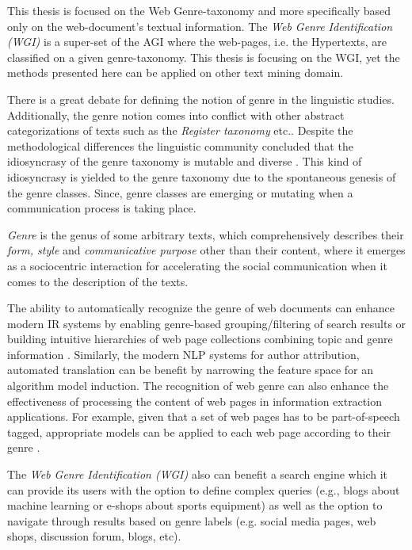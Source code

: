 This thesis is focused on the Web Genre-taxonomy and more specifically based only on the web-document's textual information. The \textit{Web Genre Identification (WGI)} is a super-set of the AGI where the web-pages, i.e. the Hypertexts, are classified on a given genre-taxonomy. This thesis is focusing on the WGI, yet the methods presented here can be applied on other text mining domain.

There is a great debate for defining the notion of genre in the linguistic studies. Additionally, the genre notion comes into conflict with other abstract categorizations of texts such as the \textit{Register taxonomy} etc.. Despite the methodological differences the linguistic community concluded that the idiosyncrasy of the genre taxonomy is mutable and diverse \parencite{coutinho2009describe}. This kind of idiosyncrasy is yielded to the genre taxonomy due to the spontaneous genesis of the genre classes. Since, genre classes are emerging or mutating when a communication process is taking place.

\theoremstyle{definition}
\begin{definition}{\textit{Genre}}
is the genus of some arbitrary texts, which comprehensively describes their \textit{form, style} and \textit{communicative purpose} other than their content, where it emerges as a sociocentric interaction for accelerating the social communication when it comes to the description of the texts.
\end{definition}

The ability to automatically recognize the genre of web documents can enhance modern IR systems by enabling genre-based grouping/filtering of search results or building intuitive hierarchies of web page collections combining topic and genre information \parencite{Braslavski2007,Rosso2008,de2009genre}. Similarly, the modern NLP systems for author attribution, automated translation can be benefit by narrowing the feature space for an algorithm model induction. The recognition of web genre can also enhance the effectiveness of processing the content of web pages in information extraction applications. For example, given that a set of web pages has to be part-of-speech tagged, appropriate models can be applied to each web page according to their genre \parencite{Nooralahzadeh2014}.

The \textit{Web Genre Identification  (WGI)} also can benefit a search engine which it can provide its users with the option to define complex queries (e.g., blogs about machine learning or e-shops about sports equipment) as well as the option to navigate through results based on genre labels (e.g. social media pages, web shops, discussion forum, blogs, etc).

